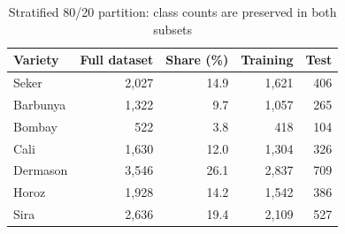\begin{table}[htbp]
\centering
\small
\caption{Stratified 80/20 partition: class counts are preserved in both subsets}
\label{tab:split}
\begin{tabular}{lrrrr}
\toprule
Variety & Full dataset & Share (\%) & Training & Test \\
\midrule
Seker & 2,027 & 14.9 & 1,621 & 406 \\
Barbunya & 1,322 & 9.7 & 1,057 & 265 \\
Bombay & 522 & 3.8 & 418 & 104 \\
Cali & 1,630 & 12.0 & 1,304 & 326 \\
Dermason & 3,546 & 26.1 & 2,837 & 709 \\
Horoz & 1,928 & 14.2 & 1,542 & 386 \\
Sira & 2,636 & 19.4 & 2,109 & 527 \\
\bottomrule
\end{tabular}
\end{table}
